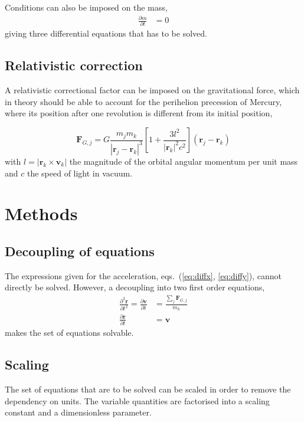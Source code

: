 \documentclass[a4paper,11pt]{article}
\begin{document}
Conditions can also be imposed on the mass,
\begin{align}
    \frac{\partial m}{\partial t} &= 0 \label{eq:diffm} 
\end{align}
giving three differential equations that has to be solved. 

\subsection{Relativistic correction}
A relativistic correctional factor can be imposed on the gravitational force, which in theory should be able to account for the perihelion precession of Mercury, where its position after one revolution is different from its initial position,

\begin{equation}
    \mathbf{F}_{G,j} = G\frac{m_j m_k}{| \mathbf{r}_j - \mathbf{r}_k |^3} \left[ 1 + \frac{3l^2}{|\mathbf{r}_k |^2 c^2} \right] \left( \mathbf{r}_j - \mathbf{r}_k \right)
    \label{eq:perihelion}
\end{equation}
with $l = |\mathbf{r}_k \times \mathbf{v}_k|$ the magnitude of the orbital angular momentum per unit mass and $c$ the speed of light in vacuum.


\section{Methods}
\subsection{Decoupling of equations}
The expressions given for the acceleration, eqs.~(\ref{eq:diffx}, \ref{eq:diffy}), cannot directly be solved. However, a decoupling into two first order equations,
\begin{align}
    \frac{\partial^2 \mathbf{r}}{\partial t^2} = \frac{\partial \mathbf{v}}{\partial t} &= \frac{\sum_j \mathbf{F}_{G,j}}{m_k} \label{eq:velocity} \\
    \frac{\partial \mathbf{r}}{\partial t} &= \mathbf{v} \label{eq:position}
\end{align}
makes the set of equations solvable.

\subsection{Scaling}
The set of equations that are to be solved can be scaled in order to remove the dependency on units. The variable quantities are factorised into a scaling constant and a dimensionless parameter.
\end{document}
